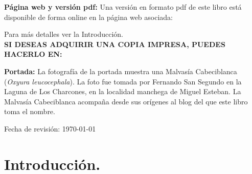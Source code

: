\documentclass[10pt,a4paper]{book}
\begin{document}
	
	\noindent
	{\bf Página web y versión pdf:}
	Una versión en formato pdf de este libro está disponible de forma online
	en la página web asociada:
	\begin{center}
		\end{center}
		Para más detalles ver la Introducción.\\
		\textbf{SI DESEAS ADQUIRIR UNA COPIA IMPRESA, PUEDES HACERLO EN:  } 
	\begin{center}
						\end{center}
		
		
		
		\vfill
		
		\vspace{0.3cm}
		
		\noindent
		{\bf Portada:} La fotografía de la portada muestra una Malvasía Cabeciblanca ({\em Oxyura leucocephala}).
		La foto fue tomada por Fernando San Segundo en la Laguna de Los Charcones, en la
		localidad manchega de Miguel Esteban. La Malvasía Cabeciblanca acompaña desde
		sus orígenes al blog del que este libro toma el nombre. \\
		
		\vspace{1cm}
		
		\noindent Fecha de revisión: \today \\
		
		\normalsize
		


\setcounter{tocdepth}{1}
\tableofcontents

\chapter*{Introducción.}

\end{document}
